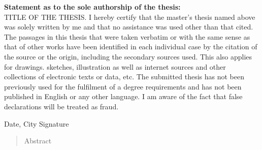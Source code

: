 \documentclass[a4paper,12pt]{report}
\begin{document}
\setcounter{secnumdepth}{1}


\noindent \textbf{Statement as to the sole authorship of the thesis:}
\vspace{0.4cm}
\\TITLE OF THE THESIS.
I hereby certify that the master's thesis named above was solely written by me and that no assistance was used other than that cited. The passages in this thesis that were taken verbatim or with the same sense as that of other works have been identified in each individual case by the citation of the source or the origin, including the secondary sources used. This also applies for drawings. sketches, illustration as well as internet sources and other collections of electronic texts or data, etc. The submitted thesis has not been previously used for the fulfilment of a degree requirements and has not been published in English or any other language. I am aware of the fact that false declarations will be treated as fraud.
\vspace{7cm}

Date, City Signature

\thispagestyle{empty}
\setcounter{tocdepth}{2}
\newpage


\begin{abstract}

Abstract

\vfill
\end{abstract}


\newpage

\tableofcontents
\listoffigures
\listoftables
\lstlistoflistings
\newpage
{}

 

 

 
 

 


\end{document}
